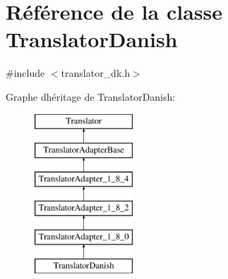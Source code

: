 \hypertarget{class_translator_danish}{}\section{Référence de la classe Translator\+Danish}
\label{class_translator_danish}


{\ttfamily \#include $<$translator\+\_\+dk.\+h$>$}

Graphe d\textquotesingle{}héritage de Translator\+Danish\+:\begin{figure}[H]
\begin{center}
\leavevmode
\includegraphics[height=6.000000cm]{class_translator_danish}
\end{center}
\end{figure}
